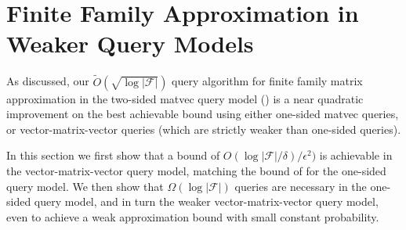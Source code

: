 \documentclass{article}[11pt]
\theoremstyle{definition}
\newcommand{\F}{\mathcal{F}}
\begin{document}



\appendix

\section{Finite Family Approximation in Weaker Query Models}\label{sec:weakerModels}

As discussed, our $\tilde O(\sqrt{\log |\F|})$ query algorithm for finite family matrix approximation in the two-sided matvec query model () is a near quadratic improvement on the best achievable bound using either one-sided matvec queries, or vector-matrix-vector queries (which are strictly weaker than one-sided queries).

In this section we first show that a bound of $O(\log|\F|/\delta)/\epsilon^2)$ is achievable in the vector-matrix-vector query model, matching the bound of  for the one-sided query model. We then show that $\Omega(\log |\F|)$ queries are necessary in the one-sided query model, and in turn the weaker vector-matrix-vector query model, even to achieve a weak approximation bound with small constant probability.
\end{document}
